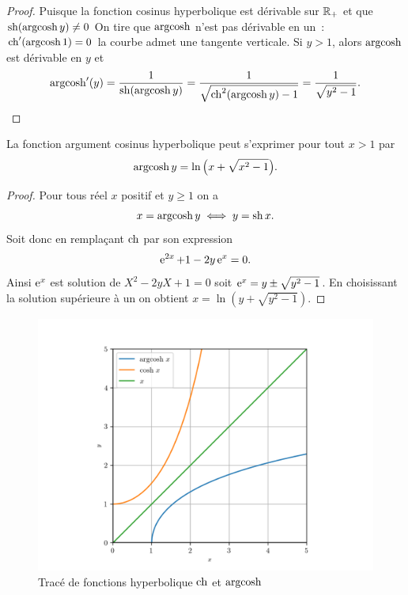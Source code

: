 \begin{proof}
  Puisque la fonction cosinus hyperbolique est dérivable sur \(\mathbb{R}_{+}\) et que
  \(\operatorname{sh}(\operatorname{argcosh} y) \neq 0\) On tire que \(\operatorname{argcosh}\) n'est pas dérivable en un~:
  \(\operatorname{ch}'(\operatorname{argcosh} 1) = 0\) la courbe admet une tangente verticale. Si \(y>1\),
  alors \(\operatorname{argcosh}\) est dérivable en \(y\) et
  \[\operatorname{argcosh}'(y) = \frac{1}{\operatorname{sh}(\operatorname{argcosh} y)} = \frac{1}{\sqrt{\operatorname{ch}^2(\operatorname{argcosh}
  y)-1}} = \frac{1}{\sqrt{y^2-1}}.\]
\end{proof}

\begin{prop} La fonction argument cosinus
  hyperbolique peut s'exprimer pour tout \(x>1\) par
  \begin{equation}
    \operatorname{argcosh}{y} = \ln{\left(x +\sqrt{x^2-1}\right)}.
  \end{equation}
\end{prop}

\begin{proof}
  Pour tous réel \(x\) positif et \(y\geq 1\) on a
  \[x = \operatorname{argcosh} y \iff y = \operatorname{sh}{x}.\]
  Soit donc en remplaçant \(\operatorname{ch}\) par son expression
  \[\operatorname{e}^{2x} +1 - 2y\operatorname{e}^x  = 0.\]
  Ainsi \(\operatorname{e}^x\) est solution de \(X^2-2yX+1 = 0\) soit \(\operatorname{e}^x = y \pm
  \sqrt{y^2-1}\). En choisissant la solution supérieure à un on obtient \(x =
  \ln \left(y+\sqrt{y^2-1} \right)\).
\end{proof}

\begin{figure}
  \centering
  \includegraphics[scale = 0.8]{argcosh.png}
  \caption{Tracé de fonctions hyperbolique \(\operatorname{ch}\) et
  \(\operatorname{argcosh}\)}\label{fig:tracecoshargcosh}
\end{figure}

